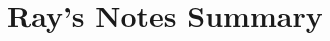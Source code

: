 \documentclass[10pt]{article}
\begin{document}



\newpage
\section{Ray's Notes Summary}
\printraynotes
\end{document}
